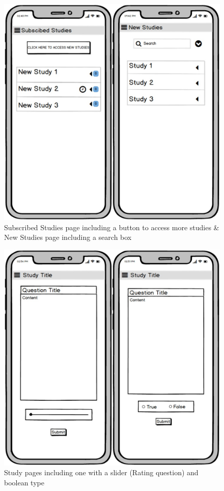 \documentclass[12pt, a4paper]{report}
\begin{document}
\begin{figure} [h]
\centering
\includegraphics[scale=0.35]{images/pic4.jpg}
\caption{\centering Subscribed Studies page including a button to access more studies & New Studies page including a search box}
\end{figure}
\begin{figure} [h]
\centering
\includegraphics[scale=0.35]{images/pic3.jpg}
\caption{\centering Study pages including one with a slider (Rating question) and boolean type}
\end{figure}
\end{document}
